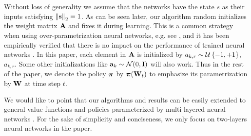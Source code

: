 Without loss of generality we assume that the networks have the state $s$ as their inputs satisfying $\left\| {\mathbf{s}} \right\|_2 = 1$.
As can be seen later, our algorithm random initializes the weight matrix ${\mathbf{A}}$ and fixes it during learning. 
This is a common strategy when using over-parametrization neural networks, e.g. see \citep{li2018learning,du2018gradientA,du2018gradientB,allen2018convergenceA,allen2018convergenceB}, and it has been empirically verified that there is no impact on the performance of trained neural networks \citep{hoffer2018fix}.
In this paper, each element in ${\mathbf{A}}$ is initialized by $a_{k,r} \sim {\mathcal{U}}\left\{-1, +1\right\}$, $a_{k,r}$. Some other initializations like ${\mathbf{a}}_k \sim {\mathcal{N}}(0, {\mathbf{I}})$ will also work. Thus in the rest of the paper, we denote the policy ${\boldsymbol{\pi}}$ by ${\boldsymbol{\pi}}({\mathbf{W}}_t)$ to emphasize its parametrization by ${\mathbf{W}}$ at time step $t$. 

We would like to point that our algorithms and results can be easily extended to general value functions and policies parameterized by multi-layered neural networks \citep{allen2018convergenceA,allen2018convergenceB,du2018gradientA}. For the sake of simplicity and conciseness, we only focus on two-layers neural networks in the paper.


